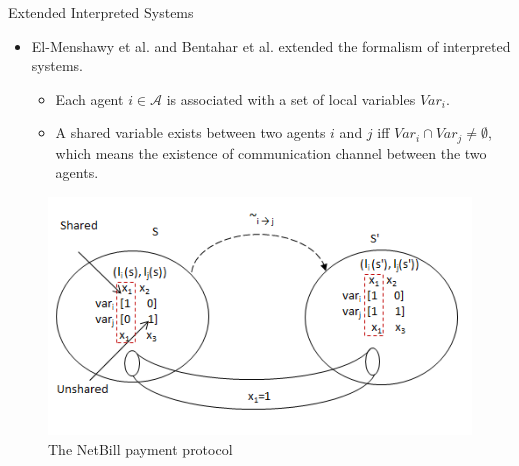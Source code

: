 \documentclass{beamer}
\begin{document}
\begin{frame}{Extended Interpreted Systems}

\begin{itemize}
\item El-Menshawy et al. and Bentahar et al. extended the formalism of interpreted systems.
    \begin{itemize}
    \item Each agent $i \in \mathcal{A}$ is associated with a set of local
variables $Var_i$.
    \item A shared variable exists between two agents $i$ and $j$ iff $ Var_i \cap Var_j \neq \emptyset$, which means the existence of communication channel between the two agents.
        \end{itemize}
\end{itemize}
\begin{figure}[htbp]
\centering
\includegraphics[width=.70 \columnwidth]{figures/figure8.png}
\caption{The NetBill payment protocol} \label{figure8}
\end{figure}

\end{frame}

\end{document}

